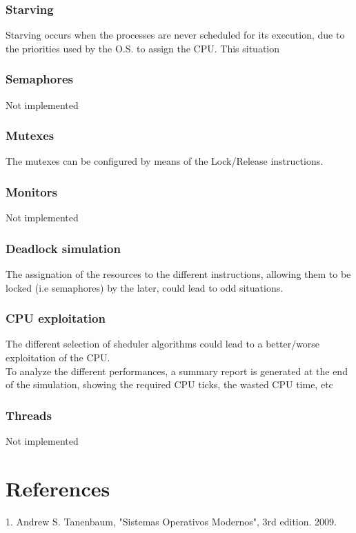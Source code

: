 \documentclass{report}
\begin{document}
        \subsection{Starving}
            Starving occurs when the processes are never scheduled for its execution, due to the priorities used by the O.S. to assign the CPU. This situation
        \subsection{Semaphores}
            Not implemented
        \subsection{Mutexes}
            The mutexes can be configured by means of the Lock/Release instructions.
        \subsection{Monitors}
            Not implemented
        \subsection{Deadlock simulation}
            The assignation of the resources to the different instructions, allowing them to be locked (i.e semaphores) by the later, could lead to odd situations. 
        \subsection{CPU exploitation}
            The different selection of sheduler algorithms could lead to a better/worse exploitation of the CPU.\\
            To analyze the different performances, a summary report is generated at the end of the simulation, showing the required CPU ticks, the wasted CPU time, etc
        \subsection{Threads}
            Not implemented
        
\chapter{References}
    1. Andrew S. Tanenbaum, "Sistemas Operativos Modernos", 3rd edition. 2009.
\end{document}
